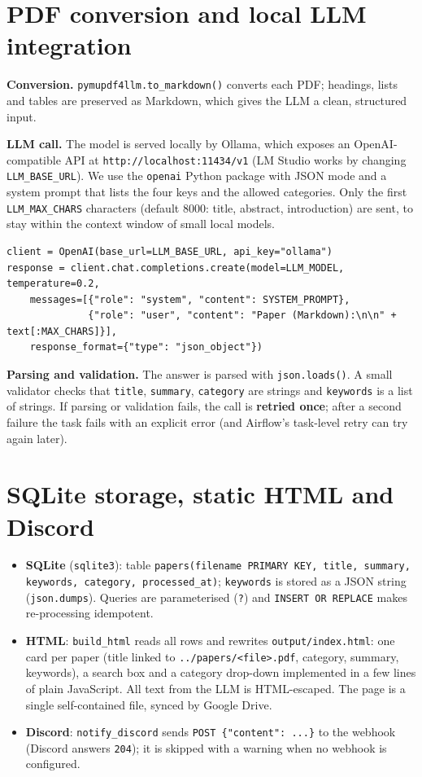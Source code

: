 \documentclass[11pt,a4paper]{article}
\begin{document}
\section{PDF conversion and local LLM integration}
\textbf{Conversion.} \texttt{pymupdf4llm.to\_markdown()} converts each PDF; headings, lists and tables
are preserved as Markdown, which gives the LLM a clean, structured input.

\textbf{LLM call.} The model is served locally by Ollama, which exposes an OpenAI-compatible API at
\texttt{http://localhost:11434/v1} (LM Studio works by changing \texttt{LLM\_BASE\_URL}). We use the
\texttt{openai} Python package with JSON mode and a system prompt that lists the four keys and the allowed categories.
Only the first \texttt{LLM\_MAX\_CHARS} characters (default 8000: title, abstract, introduction) are sent,
to stay within the context window of small local models.
\begin{lstlisting}
client = OpenAI(base_url=LLM_BASE_URL, api_key="ollama")
response = client.chat.completions.create(model=LLM_MODEL, temperature=0.2,
    messages=[{"role": "system", "content": SYSTEM_PROMPT},
              {"role": "user", "content": "Paper (Markdown):\n\n" + text[:MAX_CHARS]}],
    response_format={"type": "json_object"})
\end{lstlisting}
\textbf{Parsing and validation.} The answer is parsed with \texttt{json.loads()}. A small validator checks
that \texttt{title}, \texttt{summary}, \texttt{category} are strings and \texttt{keywords} is a list of strings.
If parsing or validation fails, the call is \textbf{retried once}; after a second failure the task fails
with an explicit error (and Airflow's task-level retry can try again later).

\section{SQLite storage, static HTML and Discord}
\begin{itemize}
  \item \textbf{SQLite} (\texttt{sqlite3}): table \texttt{papers(filename PRIMARY KEY, title, summary,
        keywords, category, processed\_at)}; \texttt{keywords} is stored as a JSON string
        (\texttt{json.dumps}). Queries are parameterised (\texttt{?}) and \texttt{INSERT OR REPLACE} makes
        re-processing idempotent.
  \item \textbf{HTML}: \texttt{build\_html} reads all rows and rewrites \texttt{output/index.html}: one card per
        paper (title linked to \texttt{../papers/<file>.pdf}, category, summary, keywords), a search box and a
        category drop-down implemented in a few lines of plain JavaScript. All text from the LLM is
        HTML-escaped. The page is a single self-contained file, synced by Google Drive.
  \item \textbf{Discord}: \texttt{notify\_discord} sends \texttt{POST \{"content": ...\}} to the webhook
        (Discord answers \texttt{204}); it is skipped with a warning when no webhook is configured.
\end{itemize}
\end{document}
